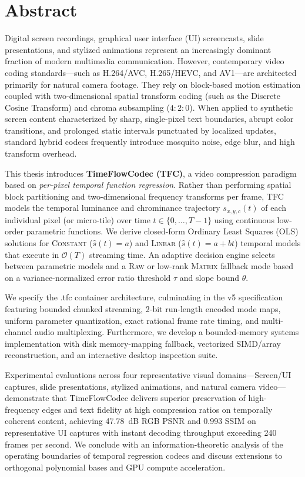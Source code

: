 \chapter*{Abstract}

Digital screen recordings, graphical user interface (UI) screencasts, slide presentations, and stylized animations represent an increasingly dominant fraction of modern multimedia communication. However, contemporary video coding standards---such as H.264/AVC, H.265/HEVC, and AV1---are architected primarily for natural camera footage. They rely on block-based motion estimation coupled with two-dimensional spatial transform coding (such as the Discrete Cosine Transform) and chroma subsampling ($4:2:0$). When applied to synthetic screen content characterized by sharp, single-pixel text boundaries, abrupt color transitions, and prolonged static intervals punctuated by localized updates, standard hybrid codecs frequently introduce mosquito noise, edge blur, and high transform overhead.

This thesis introduces \textbf{TimeFlowCodec (TFC)}, a video compression paradigm based on \textit{per-pixel temporal function regression}. Rather than performing spatial block partitioning and two-dimensional frequency transforms per frame, TFC models the temporal luminance and chrominance trajectory $s_{x,y,c}(t)$ of each individual pixel (or micro-tile) over time $t \in \{0, \dots, T-1\}$ using continuous low-order parametric functions. We derive closed-form Ordinary Least Squares (OLS) solutions for \textsc{Constant} ($\hat{s}(t) = a$) and \textsc{Linear} ($\hat{s}(t) = a + bt$) temporal models that execute in $\mathcal{O}(T)$ streaming time. An adaptive decision engine selects between parametric models and a \textsc{Raw} or low-rank \textsc{Matrix} fallback mode based on a variance-normalized error ratio threshold $\tau$ and slope bound $\theta$.

We specify the .tfc container architecture, culminating in the v5 specification featuring bounded chunked streaming, 2-bit run-length encoded mode maps, uniform parameter quantization, exact rational frame rate timing, and multi-channel audio multiplexing. Furthermore, we develop a bounded-memory systems implementation with disk memory-mapping fallback, vectorized SIMD/array reconstruction, and an interactive desktop inspection suite. 

Experimental evaluations across four representative visual domains---Screen/UI captures, slide presentations, stylized animations, and natural camera video---demonstrate that TimeFlowCodec delivers superior preservation of high-frequency edges and text fidelity at high compression ratios on temporally coherent content, achieving 47.78~dB RGB PSNR and 0.993 SSIM on representative UI captures with instant decoding throughput exceeding 240 frames per second. We conclude with an information-theoretic analysis of the operating boundaries of temporal regression codecs and discuss extensions to orthogonal polynomial bases and GPU compute acceleration.
